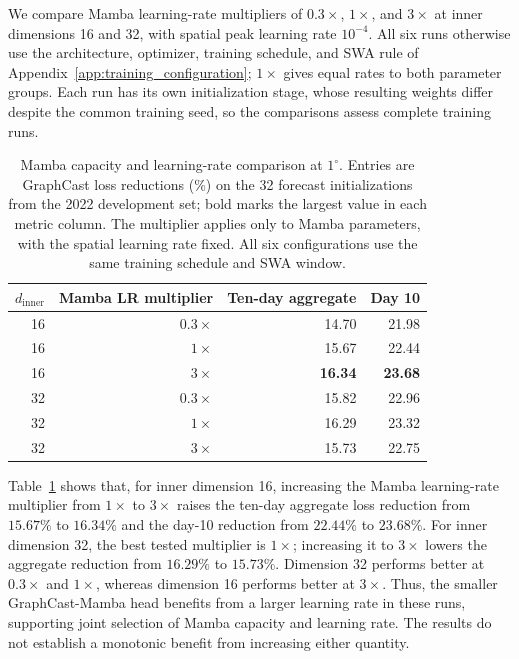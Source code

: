\documentclass{article}
\newcommand{\vfourchange}[1]{{\color{blue}#1}}
\begin{document}
\vfourchange{We compare Mamba learning-rate multipliers of $0.3\times$, $1\times$, and $3\times$ at inner dimensions 16 and 32, with spatial peak learning rate $10^{-4}$. All six runs otherwise use the architecture, optimizer, training schedule, and SWA rule of Appendix~\ref{app:training_configuration}; $1\times$ gives equal rates to both parameter groups. Each run has its own initialization stage, whose resulting weights differ despite the common training seed, so the comparisons assess complete training runs.}

\begin{table}[!htbp]
    \centering
    \caption{Mamba capacity and learning-rate comparison at $1^\circ$. Entries are {GraphCast loss} reductions (\%) on the \vfourchange{32 forecast initializations from the 2022 development set}; bold marks the largest value in each metric column. The multiplier applies only to Mamba parameters, with the spatial learning rate fixed. All six configurations use the same training schedule and SWA window.}
    \label{tab:lr_sensitivity}
    \small
    \begin{tabular}{rrrr}
        \toprule
        $d_{\mathrm{inner}}$ & Mamba LR multiplier & Ten-day aggregate & Day 10 \\
        \midrule
        16 & $0.3\times$ & 14.70 & 21.98 \\
        16 & $1\times$   & 15.67 & 22.44 \\
        16 & $3\times$   & \textbf{16.34} & \textbf{23.68} \\
        32 & $0.3\times$ & 15.82 & 22.96 \\
        32 & $1\times$   & 16.29 & 23.32 \\
        32 & $3\times$   & 15.73 & 22.75 \\
        \bottomrule
    \end{tabular}
\end{table}

\begin{samepage}
Table~\ref{tab:lr_sensitivity} shows that, for inner dimension 16, increasing the Mamba learning-rate multiplier from $1\times$ to $3\times$ raises the ten-day aggregate loss reduction from $15.67\%$ to $16.34\%$ and the day-10 reduction from $22.44\%$ to $23.68\%$. For inner dimension 32, the best tested multiplier is $1\times$; increasing it to $3\times$ lowers the aggregate reduction from $16.29\%$ to $15.73\%$. Dimension 32 performs better at $0.3\times$ and $1\times$, whereas dimension 16 performs better at $3\times$. Thus, the smaller GraphCast-Mamba head benefits from a larger learning rate in these runs, supporting joint selection of Mamba capacity and learning rate. The results do not establish a monotonic benefit from increasing either quantity.\par
\end{samepage}
\end{document}
